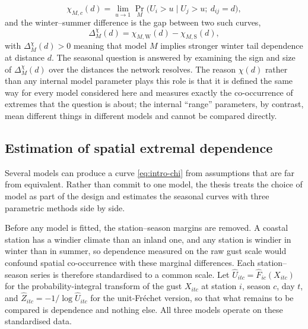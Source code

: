 \begin{equation}\label{eq:intro-chi}
    \chi_{M,c}(d)=\lim_{u\to1}\Pr_{M}\bigl(U_i>u \mid U_j>u;\ d_{ij}=d\bigr),
\end{equation}
and the winter--summer difference is the gap between two such curves,
\begin{equation}\label{eq:intro-delta}
    \Delta_M^{\chi}(d)=\chi_{M,\mathrm W}(d)-\chi_{M,\mathrm S}(d),
\end{equation}
with \(\Delta_M^{\chi}(d)>0\) meaning that model \(M\) implies stronger winter tail dependence at distance \(d\). The seasonal question is answered by examining the sign and size of \(\Delta_M^{\chi}(d)\) over the distances the network resolves. The reason \(\chi(d)\) rather than any internal model parameter plays this role is that it is defined the same way for every model considered here and measures exactly the co-occurrence of extremes that the question is about; the internal ``range'' parameters, by contrast, mean different things in different models and cannot be compared directly.

\subsection{Estimation of spatial extremal dependence}\label{sec:intro-approach}

Several models can produce a curve \ref{eq:intro-chi} from assumptions that are far from equivalent. Rather than commit to one model, the thesis treats the choice of model as part of the design and estimates the seasonal curves with three parametric methods side by side.

Before any model is fitted, the station--season margins are removed. A coastal station has a windier climate than an inland one, and any station is windier in winter than in summer, so dependence measured on the raw gust scale would confound spatial co-occurrence with these marginal differences. Each station--season series is therefore standardised to a common scale. Let \(\widehat U_{itc}=\widehat F_{ic}(X_{itc})\) for the probability-integral transform of the gust \(X_{itc}\) at station \(i\), season \(c\), day \(t\), and \(\widehat Z_{itc}=-1/\log\widehat U_{itc}\) for the unit-Fr\'echet version, so that what remains to be compared is dependence and nothing else. All three models operate on these standardised data.

